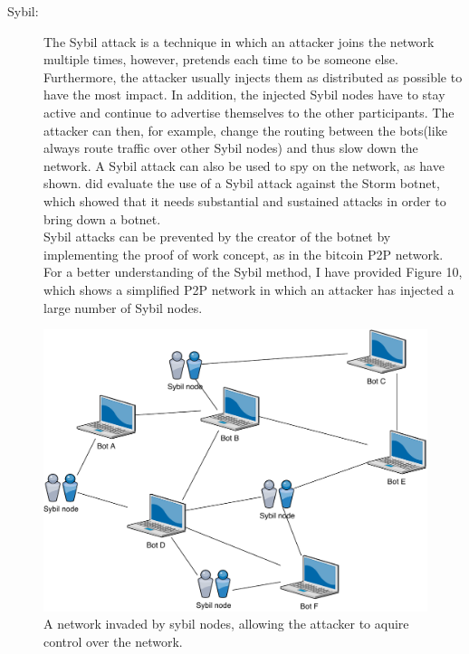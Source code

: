 \documentclass[10pt, a4paper, twocolumn]{article} %
\begin{document}
\begin{description}
\item[Sybil:] The Sybil attack is a technique in which an attacker joins the network multiple times, however, pretends each time to be someone else. Furthermore, the attacker usually injects them as distributed as possible\cite{enisa} to have the most impact. In addition, the injected Sybil nodes have to stay active and continue to advertise themselves to the other participants. The attacker can then, for example, change the routing between the bots(like always route traffic over other Sybil nodes) and thus slow down the network. A Sybil attack can also be used to spy on the network, as \citet{sybil-crawl} have shown. \citet{sybil} did evaluate the use of a Sybil attack against the Storm botnet, which showed that it needs substantial and sustained attacks in order to bring down a botnet. \\
Sybil attacks can be prevented by the creator of the botnet by implementing the proof of work concept, as in the bitcoin P2P network. For a better understanding of the Sybil method, I have provided Figure 10, which shows a simplified P2P network in which an attacker has injected a large number of Sybil nodes.
\end{description}
\begin{figure}[ht]
  \centering
  \includegraphics[width=\linewidth]{figures/sybil}
  \caption{A network invaded by sybil nodes, allowing the attacker to aquire control over the network. }
  \label{sybilfig}
\end{figure} 
\end{document}
